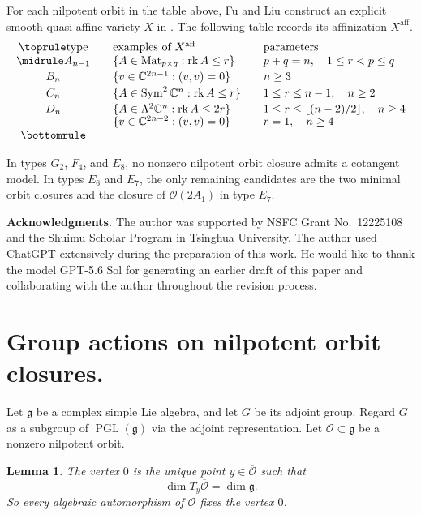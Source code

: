 \documentclass[12pt]{article}
\newtheorem{lemma}[theorem]{Lemma}
\theoremstyle{remark}
\theoremstyle{plain}
\DeclareMathOperator{\rk}{rk}
\DeclareMathOperator{\Sym}{Sym}
\DeclareMathOperator{\Mat}{Mat}
\newcommand{\C}{\mathbb C}
\newcommand{\aff}{\mathrm{aff}}
\begin{document}
For each nilpotent orbit in the table above, Fu and Liu construct an
explicit smooth quasi-affine variety $X$ in
\cite[Table 1 and Theorems 1.4 and 4.2]{FuLiu}.
The following table records its affinization $X^{\aff}$.
\[
\begin{array}{c@{\qquad}l@{\qquad}l}
\toprule
\text{type}&\text{examples of }X^{\aff}&\text{parameters}\\
\midrule
A_{n-1}&\{A\in\Mat_{p\times q}:\rk A\leq r\}
&p+q=n,\quad 1\leq r<p\leq q\\[2pt]
B_n&\{v\in\C^{2n-1}:(v,v)=0\}
&n\geq3\\[2pt]
C_n&\{A\in\Sym^2\C^n:\rk A\leq r\}
&1\leq r\leq n-1,\quad n\geq2\\[2pt]
D_n&\{A\in\Lambda^2\C^n:\rk A\leq2r\}
&1\leq r\leq\lfloor(n-2)/2\rfloor,\quad n\geq4\\[-1pt]
&\{v\in\C^{2n-2}:(v,v)=0\}
&r=1,\quad n\geq4\\
\bottomrule
\end{array}
\]

In types $G_2$, $F_4$, and $E_8$, no nonzero nilpotent orbit closure
admits a cotangent model.
In types $E_6$ and $E_7$, the only remaining candidates are the two
minimal orbit closures and the closure of $\mathcal O(2A_1)$ in type
$E_7$.

\vspace{1em}
\textbf{Acknowledgments.}
The author was supported by NSFC Grant No.~12225108 and the Shuimu Scholar
Program in Tsinghua University. The author used ChatGPT extensively during
the preparation of this work. He would like to thank the model GPT-5.6 Sol
for generating an earlier draft of this paper and collaborating with the
author throughout the revision process.

\section{Group actions on nilpotent orbit closures.}

Let $\mathfrak g$ be a complex simple Lie algebra, and let $G$ be its
adjoint group.
Regard $G$ as a subgroup of $\operatorname{PGL}(\mathfrak g)$ via the
adjoint representation.
Let $\mathcal O\subset\mathfrak g$ be a nonzero nilpotent orbit.

\begin{lemma}\label{lem:intrinsic-vertex}
The vertex $0$ is the unique point $y\in\overline{\mathcal O}$ such that
\[
\dim T_y\overline{\mathcal O}=\dim\mathfrak g.
\]
So every algebraic automorphism of $\overline{\mathcal O}$ fixes the vertex $0$.
\end{lemma}
\end{document}
